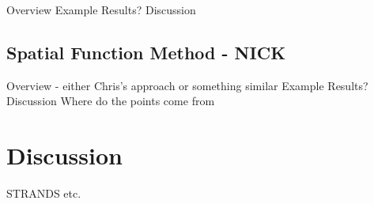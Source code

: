 \documentclass[11pt,letterpaper]{article}
\begin{document}
Overview
Example
Results?
Discussion

\subsection{Spatial Function Method - NICK}

Overview - either Chris's approach or something similar
Example
Results?
Discussion 
Where do the points come from

\section{Discussion}
 
\begin{acknowledgements} 
\noindent
STRANDS etc.
\end{acknowledgements} 




\vspace{-0.25in}

{\parindent -10pt\leftskip 10pt\noindent



}

\end{document}
